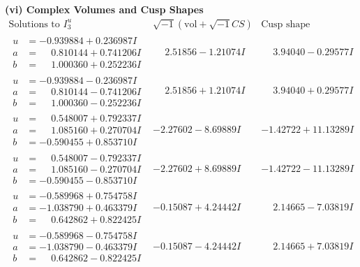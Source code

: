 \documentclass[1p]{elsarticle_modified}
\theoremstyle{definition}
\newcommand{\I}{\sqrt{-1}}
\begin{document}
\newpage\flushleft \textbf{(vi) Complex Volumes and Cusp Shapes}
$$\begin{array}{c|c|c}  
\text{Solutions to }I^u_{3}& \I (\text{vol} + \sqrt{-1}CS) & \text{Cusp shape}\\
 \hline 
\begin{aligned}
u &= -0.939884 + 0.236987 I \\
a &= \phantom{-}0.810144 + 0.741206 I \\
b &= \phantom{-}1.000360 + 0.252236 I\end{aligned}
 & \phantom{-}2.51856 - 1.21074 I & \phantom{-}3.94040 - 0.29577 I \\ \hline\begin{aligned}
u &= -0.939884 - 0.236987 I \\
a &= \phantom{-}0.810144 - 0.741206 I \\
b &= \phantom{-}1.000360 - 0.252236 I\end{aligned}
 & \phantom{-}2.51856 + 1.21074 I & \phantom{-}3.94040 + 0.29577 I \\ \hline\begin{aligned}
u &= \phantom{-}0.548007 + 0.792337 I \\
a &= \phantom{-}1.085160 + 0.270704 I \\
b &= -0.590455 + 0.853710 I\end{aligned}
 & -2.27602 - 8.69889 I & -1.42722 + 11.13289 I \\ \hline\begin{aligned}
u &= \phantom{-}0.548007 - 0.792337 I \\
a &= \phantom{-}1.085160 - 0.270704 I \\
b &= -0.590455 - 0.853710 I\end{aligned}
 & -2.27602 + 8.69889 I & -1.42722 - 11.13289 I \\ \hline\begin{aligned}
u &= -0.589968 + 0.754758 I \\
a &= -1.038790 + 0.463379 I \\
b &= \phantom{-}0.642862 + 0.822425 I\end{aligned}
 & -0.15087 + 4.24442 I & \phantom{-}2.14665 - 7.03819 I \\ \hline\begin{aligned}
u &= -0.589968 - 0.754758 I \\
a &= -1.038790 - 0.463379 I \\
b &= \phantom{-}0.642862 - 0.822425 I\end{aligned}
 & -0.15087 - 4.24442 I & \phantom{-}2.14665 + 7.03819 I \\ \hline\begin{aligned}

\end{aligned}
\end{array}$$
\end{document}
